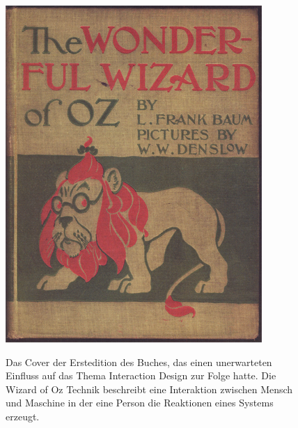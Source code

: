 \begin{figure}
	\begin{center}
        {\includegraphics[width=\linewidth]{gfx/buxtonWizardOz}}
	\end{center}
		\caption[Wizard of Oz \newline \citep{Buxton:2007}]{Das Cover der Erstedition des Buches, das einen unerwarteten Einfluss auf das Thema Interaction Design zur Folge hatte. Die Wizard of Oz Technik beschreibt eine Interaktion zwischen Mensch und Maschine in der eine Person die Reaktionen eines Systems erzeugt.}\label{fig:buxtonWizardOz}
\end{figure}

